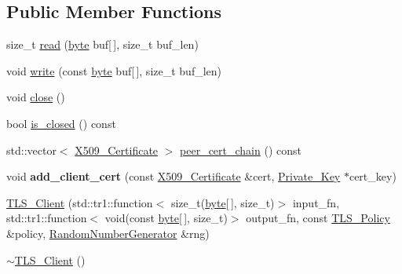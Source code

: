 \subsection*{Public Member Functions}
\begin{DoxyCompactItemize}
\item 
size\-\_\-t \hyperlink{classBotan_1_1TLS__Client_ac2520602f2da30b5e70011f9fa2e2eaa}{read} (\hyperlink{namespaceBotan_a7d793989d801281df48c6b19616b8b84}{byte} buf\mbox{[}$\,$\mbox{]}, size\-\_\-t buf\-\_\-len)
\item 
void \hyperlink{classBotan_1_1TLS__Client_ae0b5e5e3410a5b49ae6390056b2c6302}{write} (const \hyperlink{namespaceBotan_a7d793989d801281df48c6b19616b8b84}{byte} buf\mbox{[}$\,$\mbox{]}, size\-\_\-t buf\-\_\-len)
\item 
void \hyperlink{classBotan_1_1TLS__Client_a7539b873cb54b6343c45d7602f53f3dc}{close} ()
\item 
bool \hyperlink{classBotan_1_1TLS__Client_af6d5232da57185a34446cdeba9e0e4ff}{is\-\_\-closed} () const 
\item 
std\-::vector$<$ \hyperlink{classBotan_1_1X509__Certificate}{X509\-\_\-\-Certificate} $>$ \hyperlink{classBotan_1_1TLS__Client_a53d8485c005f3ecc61994a5714252114}{peer\-\_\-cert\-\_\-chain} () const 
\item 
\hypertarget{classBotan_1_1TLS__Client_af4c3111e38f1c304fb2f060f0bbf59b4}{void {\bfseries add\-\_\-client\-\_\-cert} (const \hyperlink{classBotan_1_1X509__Certificate}{X509\-\_\-\-Certificate} \&cert, \hyperlink{classBotan_1_1Private__Key}{Private\-\_\-\-Key} $\ast$cert\-\_\-key)}\label{classBotan_1_1TLS__Client_af4c3111e38f1c304fb2f060f0bbf59b4}

\item 
\hyperlink{classBotan_1_1TLS__Client_a46b4e8fb0a74b9c1f0e58df4c904cfa0}{T\-L\-S\-\_\-\-Client} (std\-::tr1\-::function$<$ size\-\_\-t(\hyperlink{namespaceBotan_a7d793989d801281df48c6b19616b8b84}{byte}\mbox{[}$\,$\mbox{]}, size\-\_\-t)$>$ input\-\_\-fn, std\-::tr1\-::function$<$ void(const \hyperlink{namespaceBotan_a7d793989d801281df48c6b19616b8b84}{byte}\mbox{[}$\,$\mbox{]}, size\-\_\-t)$>$ output\-\_\-fn, const \hyperlink{classBotan_1_1TLS__Policy}{T\-L\-S\-\_\-\-Policy} \&policy, \hyperlink{classBotan_1_1RandomNumberGenerator}{Random\-Number\-Generator} \&rng)
\item 
\hyperlink{classBotan_1_1TLS__Client_af12ea661ca2ca8e832fbcc63c66eb6b6}{$\sim$\-T\-L\-S\-\_\-\-Client} ()
\end{DoxyCompactItemize}



